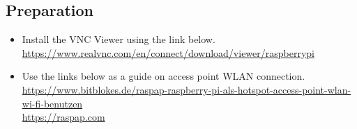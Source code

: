 

\subsection*{\Large Preparation}

    \begin{itemize}
        \item Install the VNC Viewer using the link below.\\
        \small{\url{https://www.realvnc.com/en/connect/download/viewer/raspberrypi}}\\ 
        
        \item  \Large{Use the links below as a guide on access point WLAN connection.} \\
        \small{\url{https://www.bitblokes.de/raspap-raspberry-pi-als-hotspot-access-point-wlan-wi-fi-benutzen}}\\
        \small{\url{https://raspap.com}}\\
    \end{itemize}